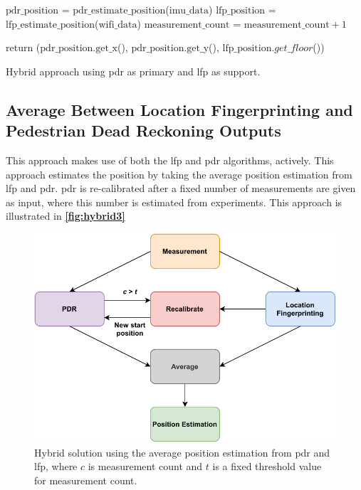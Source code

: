 \begin{algorithm}[H]
\SetAlgoLined
{}
  $\text{pdr\_position}$ = $\text{pdr\_estimate\_position}$($\text{imu\_data}$)\;
  $\text{lfp\_position}$ = $\text{lfp\_estimate\_position}$($\text{wifi\_data}$)\;
  $\text{measurement\_count}$ = $\text{measurement\_count} + 1$\;
  
  
  return ($\text{pdr\_position.get\_x}$(), $\text{pdr\_position.get\_y}$(), $\text{lfp\_position}.get\_floor$())\;
 \caption{Hybrid approach using \gls{pdr} as primary and \gls{lfp} as support.}
 \label{alg:pdrml_hybrid}
\end{algorithm}

\subsection{Average Between Location Fingerprinting and Pedestrian Dead Reckoning Outputs}
This approach makes use of both the \gls{lfp} and \gls{pdr} algorithms, actively. This approach estimates the position by taking the average position estimation from \gls{lfp} and \gls{pdr}. \gls{pdr} is re-calibrated after a fixed number of measurements are given as input, where this number is estimated from experiments. This approach is illustrated in \textbf{\autoref{fig:hybrid3}}

\begin{figure}[H]
    \centering
    \includegraphics[scale=0.85]{Images/Experiments/hybrid/approach3.pdf}
    \caption{Hybrid solution using the average position estimation from \gls{pdr} and \gls{lfp}, where $c$ is measurement count and $t$ is a fixed threshold value for measurement count.}
     \label{fig:hybrid3}
\end{figure}

